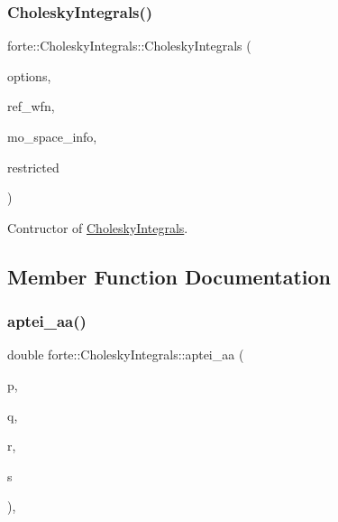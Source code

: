 \subsubsection{\texorpdfstring{Cholesky\+Integrals()}{CholeskyIntegrals()}}
{\footnotesize\ttfamily forte\+::\+Cholesky\+Integrals\+::\+Cholesky\+Integrals (\begin{DoxyParamCaption}\item[{std\+::shared\+\_\+ptr$<$ \mbox{\hyperlink{classforte_1_1_forte_options}{Forte\+Options}} $>$}]{options,  }\item[{std\+::shared\+\_\+ptr$<$ psi\+::\+Wavefunction $>$}]{ref\+\_\+wfn,  }\item[{std\+::shared\+\_\+ptr$<$ \mbox{\hyperlink{classforte_1_1_m_o_space_info}{M\+O\+Space\+Info}} $>$}]{mo\+\_\+space\+\_\+info,  }\item[{\mbox{\hyperlink{namespaceforte_a7defa2660dd3eb07aa81176b90781be7}{Integral\+Spin\+Restriction}}}]{restricted }\end{DoxyParamCaption})}



Contructor of \mbox{\hyperlink{classforte_1_1_cholesky_integrals}{Cholesky\+Integrals}}. 



\subsection{Member Function Documentation}
\mbox{\label{classforte_1_1_cholesky_integrals_a118be3ea0020672f3d3e6ce4602cc14c}} 
\subsubsection{\texorpdfstring{aptei\+\_\+aa()}{aptei\_aa()}}
{\footnotesize\ttfamily double forte\+::\+Cholesky\+Integrals\+::aptei\+\_\+aa (\begin{DoxyParamCaption}\item[{size\+\_\+t}]{p,  }\item[{size\+\_\+t}]{q,  }\item[{size\+\_\+t}]{r,  }\item[{size\+\_\+t}]{s }\end{DoxyParamCaption})\hspace{0.3cm}{\ttfamily [override]}, {\ttfamily [virtual]}}

